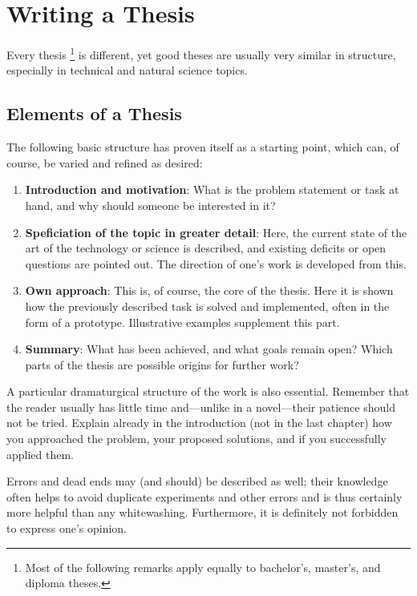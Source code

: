 \chapter{Writing a Thesis}
\label{cha:TheThesis}

Every thesis%
\footnote{Most of the following remarks apply equally to bachelor's, master's,
and diploma theses.}
is different, yet good theses are usually very similar in structure, especially
in technical and natural science topics.

\section{Elements of a Thesis}

The following basic structure has proven itself as a starting point, which can,
of course, be varied and refined as desired:
%
\begin{enumerate}
	\item \textbf{Introduction and motivation}: What is the problem statement or
	task at hand, and why should someone be interested in it?
	\item \textbf{Speficiation of the topic in greater detail}: Here, the
	current state of the art of the technology or science is described, and
	existing deficits or open questions are pointed out. The direction of one's
	work is developed from this.
	\item \textbf{Own approach}: This is, of course, the core of the thesis.
	Here it is shown how the previously described task is solved and
	implemented, often in the form of a prototype. Illustrative examples
	supplement this part.
	\item \textbf{Summary}: What has been achieved, and what goals remain open?
	Which parts of the thesis are possible origins for further work?
\end{enumerate}
%
A particular dramaturgical structure of the work is also essential. Remember
that the reader usually has little time and---unlike in a novel---their
patience should not be tried. Explain already in the introduction (not in the
last chapter) how you approached the problem, your proposed solutions, and if
you successfully applied them.

Errors and dead ends may (and should) be described as well; their knowledge
often helps to avoid duplicate experiments and other errors and is thus
certainly more helpful than any whitewashing. Furthermore, it is definitely
not forbidden to express one's opinion.


